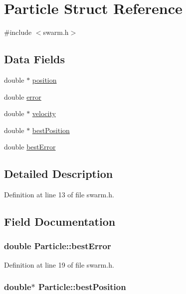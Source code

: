 \hypertarget{structParticle}{\section{Particle Struct Reference}
\label{structParticle}
}


{\ttfamily \#include $<$swarm.\-h$>$}

\subsection*{Data Fields}
\begin{DoxyCompactItemize}
\item 
double $\ast$ \hyperlink{structParticle_ae3022a2f22a4b538d6637c54d5072cc6}{position}
\item 
double \hyperlink{structParticle_a0a7996980f49aae07b094f3ce0f35ef2}{error}
\item 
double $\ast$ \hyperlink{structParticle_a7d8ccf7f88745286635bfcd97bff393c}{velocity}
\item 
double $\ast$ \hyperlink{structParticle_a54e399e9a001c0a821862e44692ad338}{best\-Position}
\item 
double \hyperlink{structParticle_a87ddaaab3b2ffaf18d80cefebc4b4ceb}{best\-Error}
\end{DoxyCompactItemize}


\subsection{Detailed Description}


Definition at line 13 of file swarm.\-h.



\subsection{Field Documentation}
\hypertarget{structParticle_a87ddaaab3b2ffaf18d80cefebc4b4ceb}{
\subsubsection[{best\-Error}]{\setlength{\rightskip}{0pt plus 5cm}double Particle\-::best\-Error}}\label{structParticle_a87ddaaab3b2ffaf18d80cefebc4b4ceb}


Definition at line 19 of file swarm.\-h.

\hypertarget{structParticle_a54e399e9a001c0a821862e44692ad338}{
\subsubsection[{best\-Position}]{\setlength{\rightskip}{0pt plus 5cm}double$\ast$ Particle\-::best\-Position}}\label{structParticle_a54e399e9a001c0a821862e44692ad338}


